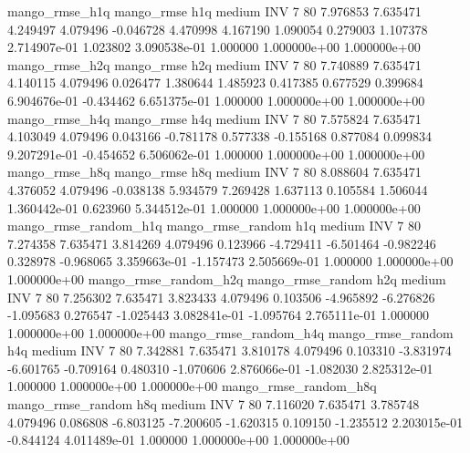        mango_rmse_h1q        mango_rmse                  h1q     medium      INV                 7 80  7.976853       7.635471 4.249497       4.079496   -0.046728      4.470998      4.167190     1.090054       0.279003  1.107378 2.714907e-01     1.023802   3.090538e-01            1.000000    1.000000e+00        1.000000e+00
       mango_rmse_h2q        mango_rmse                  h2q     medium      INV                 7 80  7.740889       7.635471 4.140115       4.079496    0.026477      1.380644      1.485923     0.417385       0.677529  0.399684 6.904676e-01    -0.434462   6.651375e-01            1.000000    1.000000e+00        1.000000e+00
       mango_rmse_h4q        mango_rmse                  h4q     medium      INV                 7 80  7.575824       7.635471 4.103049       4.079496    0.043166     -0.781178      0.577338    -0.155168       0.877084  0.099834 9.207291e-01    -0.454652   6.506062e-01            1.000000    1.000000e+00        1.000000e+00
       mango_rmse_h8q        mango_rmse                  h8q     medium      INV                 7 80  8.088604       7.635471 4.376052       4.079496   -0.038138      5.934579      7.269428     1.637113       0.105584  1.506044 1.360442e-01     0.623960   5.344512e-01            1.000000    1.000000e+00        1.000000e+00
mango_rmse_random_h1q mango_rmse_random                  h1q     medium      INV                 7 80  7.274358       7.635471 3.814269       4.079496    0.123966     -4.729411     -6.501464    -0.982246       0.328978 -0.968065 3.359663e-01    -1.157473   2.505669e-01            1.000000    1.000000e+00        1.000000e+00
mango_rmse_random_h2q mango_rmse_random                  h2q     medium      INV                 7 80  7.256302       7.635471 3.823433       4.079496    0.103506     -4.965892     -6.276826    -1.095683       0.276547 -1.025443 3.082841e-01    -1.095764   2.765111e-01            1.000000    1.000000e+00        1.000000e+00
mango_rmse_random_h4q mango_rmse_random                  h4q     medium      INV                 7 80  7.342881       7.635471 3.810178       4.079496    0.103310     -3.831974     -6.601765    -0.709164       0.480310 -1.070606 2.876066e-01    -1.082030   2.825312e-01            1.000000    1.000000e+00        1.000000e+00
mango_rmse_random_h8q mango_rmse_random                  h8q     medium      INV                 7 80  7.116020       7.635471 3.785748       4.079496    0.086808     -6.803125     -7.200605    -1.620315       0.109150 -1.235512 2.203015e-01    -0.844124   4.011489e-01            1.000000    1.000000e+00        1.000000e+00
